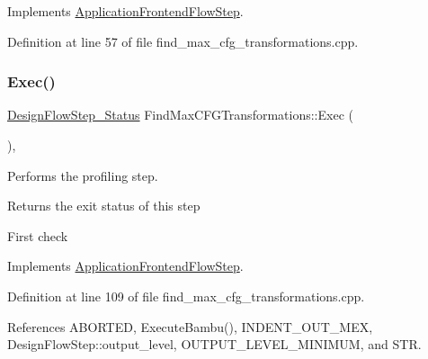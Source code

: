 Implements \hyperlink{classApplicationFrontendFlowStep_ab308200c0096ccff3a1ff50e864ed61f}{Application\+Frontend\+Flow\+Step}.



Definition at line 57 of file find\+\_\+max\+\_\+cfg\+\_\+transformations.\+cpp.

\mbox{\label{classFindMaxCFGTransformations_a6ac50147095421ddfda88a6fbb33e969}} 
\subsubsection{\texorpdfstring{Exec()}{Exec()}}
{\footnotesize\ttfamily \hyperlink{design__flow__step_8hpp_afb1f0d73069c26076b8d31dbc8ebecdf}{Design\+Flow\+Step\+\_\+\+Status} Find\+Max\+C\+F\+G\+Transformations\+::\+Exec (\begin{DoxyParamCaption}{ }\end{DoxyParamCaption})\hspace{0.3cm}{\ttfamily [override]}, {\ttfamily [virtual]}}



Performs the profiling step. 

\begin{DoxyReturn}{Returns}
the exit status of this step 
\end{DoxyReturn}
First check 

Implements \hyperlink{classApplicationFrontendFlowStep_a2bf060a5ebc1735635dc5c7773387a25}{Application\+Frontend\+Flow\+Step}.



Definition at line 109 of file find\+\_\+max\+\_\+cfg\+\_\+transformations.\+cpp.



References A\+B\+O\+R\+T\+ED, Execute\+Bambu(), I\+N\+D\+E\+N\+T\+\_\+\+O\+U\+T\+\_\+\+M\+EX, Design\+Flow\+Step\+::output\+\_\+level, O\+U\+T\+P\+U\+T\+\_\+\+L\+E\+V\+E\+L\+\_\+\+M\+I\+N\+I\+M\+UM, and S\+TR.

